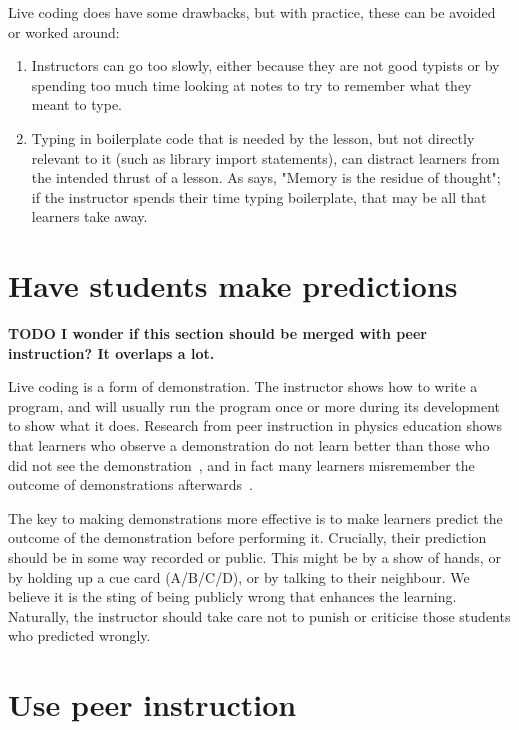 \documentclass{article}
\begin{document}
Live coding does have some drawbacks, but with practice, these can be
avoided or worked around:

\begin{enumerate}
\item  Instructors can go too slowly, either because they are not good
    typists or by spending too much time looking at notes to try to
    remember what they meant to type.

\item  Typing in boilerplate code that is needed by the lesson, but not
    directly relevant to it (such as library import statements), can
    distract learners from the intended thrust of a lesson.  As
    \citet{willingham-book} says, "Memory is the residue of thought";
    if the instructor spends their time typing boilerplate, that may
    be all that learners take away.
\end{enumerate}

\section{Have students make predictions}

\textbf{TODO I wonder if this section should be merged with peer instruction?  It overlaps a lot.}

Live coding is a form of demonstration.  The instructor shows how to write a program, and will usually run the program once or more during its development to show what it does.  Research from peer instruction in physics education shows that learners who observe a demonstration do not learn better than those who did not see the demonstration~\citep{crouch-demo}, and in fact many learners misremember the outcome of demonstrations afterwards~\citep{miller-demo}.

The key to making demonstrations more effective is to make learners predict the outcome of the demonstration before performing it.  Crucially, their prediction should be in some way recorded or public.  This might be by a show of hands, or by holding up a cue card (A/B/C/D), or by talking to their neighbour.  We believe it is the sting of being publicly wrong that enhances the learning.  Naturally, the instructor should take care not to punish or criticise those students who predicted wrongly.

\section{Use peer instruction}
\end{document}
